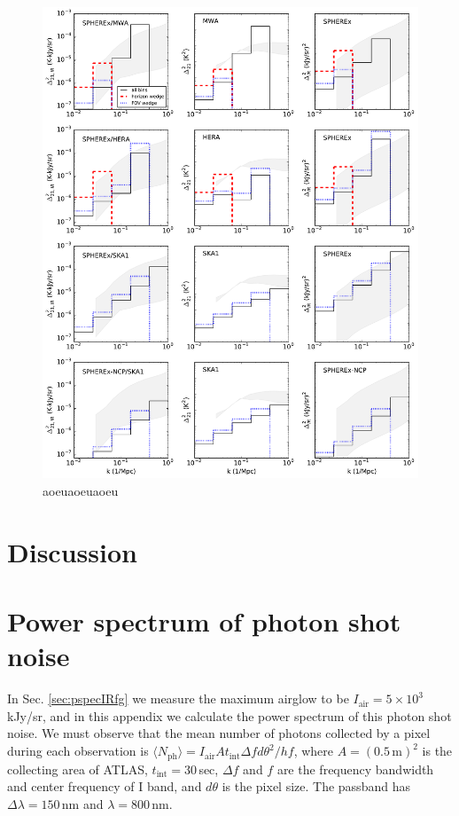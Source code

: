 \documentclass{emulateapj}
\begin{document}
\begin{figure}[h]
\centering
\includegraphics[width=7in]{images/cross_and_auto_sensitivity_for_diff_expts.pdf}
\caption{aoeuaoeuaoeu}
\label{fig:corgrid}
\end{figure}






\section{Discussion}

\appendix

\section{Power spectrum of photon shot noise}
\label{sec:Pshot}

In Sec. \ref{sec:pspecIRfg} we measure the maximum airglow to be $I_\text{air}=5\times10^3$ kJy/sr, and in this appendix we calculate the power spectrum of this photon shot noise. We must observe that the mean number of photons collected by a pixel during each observation is $\langle N_\text{ph}\rangle=I_\text{air}At_\text{int} \Delta f d\theta^2/hf$, where $A=(0.5\,\text{m})^2$ is the collecting area of ATLAS, $t_\text{int}=30\,$sec, $\Delta f$ and $f$ are the frequency bandwidth and center frequency of I band, and $d\theta$ is the pixel size. The passband has $\Delta\lambda=150\,$nm and $\lambda=800\,$nm. 
\end{document}
